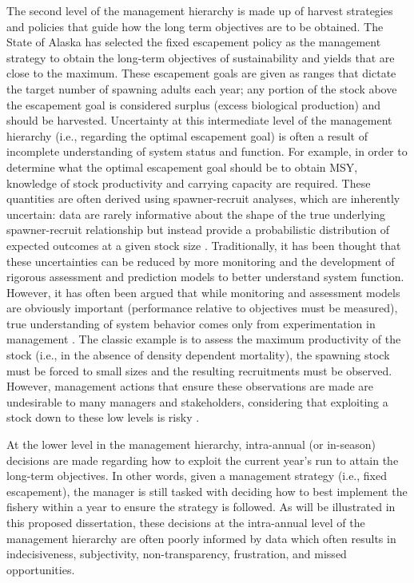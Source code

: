 \documentclass[12pt,]{book}
\theoremstyle{definition}
\theoremstyle{definition}
\theoremstyle{definition}
\theoremstyle{remark}
\begin{document}
The second level of the management hierarchy is made up of harvest
strategies and policies that guide how the long term objectives are to
be obtained. The State of Alaska has selected the fixed escapement
policy as the management strategy to obtain the long-term objectives of
sustainability and yields that are close to the maximum. These
escapement goals are given as ranges that dictate the target number of
spawning adults each year; any portion of the stock above the escapement
goal is considered surplus (excess biological production) and should be
harvested. Uncertainty at this intermediate level of the management
hierarchy (i.e., regarding the optimal escapement goal) is often a
result of incomplete understanding of system status and function. For
example, in order to determine what the optimal escapement goal should
be to obtain MSY, knowledge of stock productivity and carrying capacity
are required. These quantities are often derived using spawner-recruit
analyses, which are inherently uncertain: data are rarely informative
about the shape of the true underlying spawner-recruit relationship but
instead provide a probabilistic distribution of expected outcomes at a
given stock size \citep{walters-martell-2004}. Traditionally, it has
been thought that these uncertainties can be reduced by more monitoring
and the development of rigorous assessment and prediction models to
better understand system function. However, it has often been argued
that while monitoring and assessment models are obviously important
(performance relative to objectives must be measured), true
understanding of system behavior comes only from experimentation in
management \citep[the concept of ``active adaptive
management'';][]{walters-1986}. The classic example is to assess the
maximum productivity of the stock (i.e., in the absence of density
dependent mortality), the spawning stock must be forced to small sizes
and the resulting recruitments must be observed. However, management
actions that ensure these observations are made are undesirable to many
managers and stakeholders, considering that exploiting a stock down to
these low levels is risky \citep{walters-1986}.

At the lower level in the management hierarchy, intra-annual (or
in-season) decisions are made regarding how to exploit the current
year's run to attain the long-term objectives. In other words, given a
management strategy (i.e., fixed escapement), the manager is still
tasked with deciding how to best implement the fishery within a year to
ensure the strategy is followed. As will be illustrated in this proposed
dissertation, these decisions at the intra-annual level of the
management hierarchy are often poorly informed by data which often
results in indecisiveness, subjectivity, non-transparency, frustration,
and missed opportunities.
\end{document}
